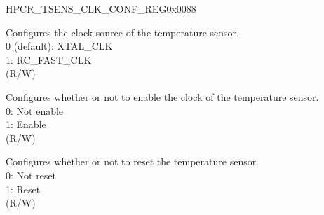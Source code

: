 \begin{register}{H}{PCR\_TSENS\_CLK\_CONF\_REG}{0x0088}\label{regdesc:PCRTSENSCLKCONFREG}
%
%
%
%
%
%
\regnewline%
\begin{regdesc}\begin{reglist}
\label{fielddesc:PCRTSENSCLKSEL}\item [PCR\_TSENS\_CLK\_SEL] Configures the clock source of the temperature sensor.\\ 
0 (default): XTAL\_CLK\\
1: RC\_FAST\_CLK\\ (R/W)
\label{fielddesc:PCRTSENSCLKEN}\item [PCR\_TSENS\_CLK\_EN] Configures whether or not to enable the clock of the temperature sensor. \\
0: Not enable\\
1: Enable\\ (R/W)
\label{fielddesc:PCRTSENSRSTEN}\item [PCR\_TSENS\_RST\_EN] Configures whether or not to reset the temperature sensor.\\ 
0: Not reset\\ 
1: Reset\\(R/W)
\end{reglist}\end{regdesc}
\end{register}


